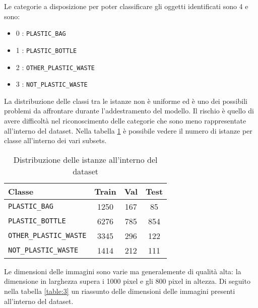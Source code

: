 Le categorie a disposizione per poter classificare gli oggetti identificati sono 4 e sono:

\begin{itemize}
    \item 0 : \verb+PLASTIC_BAG+
    \item 1 : \verb+PLASTIC_BOTTLE+
    \item 2 : \verb+OTHER_PLASTIC_WASTE+
    \item 3 : \verb+NOT_PLASTIC_WASTE+
\end{itemize}

La distribuzione delle classi tra le istanze non è uniforme ed è uno dei possibili problemi da affrontare durante l'addestramento del modello.
Il rischio è quello di avere difficoltà nel riconoscimento delle categorie che sono meno rappresentate all'interno del dataset.
Nella tabella \ref{table:2} è possibile vedere il numero di istanze per classe all'interno dei vari subsets.

\begin{table}[h!]
    \centering
    \begin{tabular}{ lccc } 
    \hline
    \textbf{Classe} & \textbf{Train} & \textbf{Val} & \textbf{Test} \\ 
    \hline
    \verb+PLASTIC_BAG+ & 1250 & 167 & 85 \\ 
    \verb+PLASTIC_BOTTLE+ & 6276 & 785 & 854 \\ 
    \verb+OTHER_PLASTIC_WASTE+ & 3345 & 296 & 122 \\ 
    \verb+NOT_PLASTIC_WASTE+ & 1414 & 212 & 111 \\
    \hline
    \end{tabular}
    \caption{Distribuzione delle istanze all'interno del dataset}
\label{table:2}
\end{table}

Le dimensioni delle immagini sono varie ma generalemente di qualità alta: la dimensione in larghezza supera i 1000 pixel e gli 800 pixel in altezza. Di seguito nella tabella \ref{table:3} un riassunto delle dimensioni delle immagini presenti all'interno del dataset.


